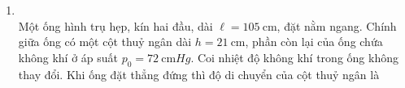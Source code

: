 \begin{enumerate}[label=\bfseries Câu \arabic*:, leftmargin=1.7cm]
\item {}\\
Một ống hình trụ hẹp, kín hai đầu, dài $\ell=\SI{105}{\centi\meter}$, đặt nằm ngang. Chính giữa ống có một cột thuỷ ngân dài $h=\SI{21}{\centi\meter}$, phần còn lại của ống chứa không khí ở áp suất $p_0=\SI{72}{\centi\meter Hg}$. Coi nhiệt độ không khí trong ống không thay đổi. Khi ống đặt thẳng đứng thì độ di chuyển của cột thuỷ ngân là


\end{enumerate}
